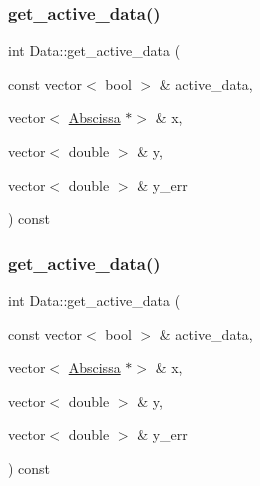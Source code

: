 \mbox{\label{classData_aa57667ce832cbf712b9a77a70ccfdbac}} 
\subsubsection{\texorpdfstring{get\_active\_data()}{get\_active\_data()}\hspace{0.1cm}{\footnotesize\ttfamily [5/6]}}
{\footnotesize\ttfamily int Data\+::get\+\_\+active\+\_\+data (\begin{DoxyParamCaption}\item[{const vector$<$ bool $>$ \&}]{active\+\_\+data,  }\item[{vector$<$ \mbox{\hyperlink{classAbscissa}{Abscissa}} $\ast$$>$ \&}]{x,  }\item[{vector$<$ double $>$ \&}]{y,  }\item[{vector$<$ double $>$ \&}]{y\+\_\+err }\end{DoxyParamCaption}) const}

\mbox{\label{classData_aa57667ce832cbf712b9a77a70ccfdbac}} 
\subsubsection{\texorpdfstring{get\_active\_data()}{get\_active\_data()}\hspace{0.1cm}{\footnotesize\ttfamily [6/6]}}
{\footnotesize\ttfamily int Data\+::get\+\_\+active\+\_\+data (\begin{DoxyParamCaption}\item[{const vector$<$ bool $>$ \&}]{active\+\_\+data,  }\item[{vector$<$ \mbox{\hyperlink{classAbscissa}{Abscissa}} $\ast$$>$ \&}]{x,  }\item[{vector$<$ double $>$ \&}]{y,  }\item[{vector$<$ double $>$ \&}]{y\+\_\+err }\end{DoxyParamCaption}) const}

\mbox{\label{classData_a2852ff59adff1f77d3e0ce4c620fe501}} 
